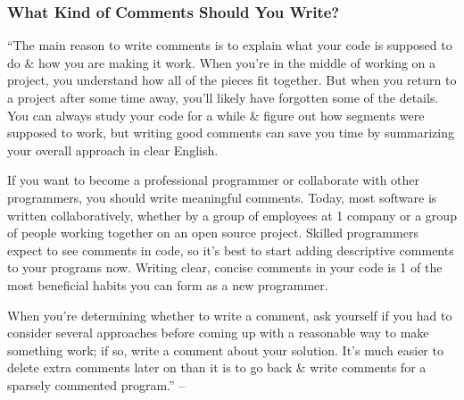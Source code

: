 \documentclass[oneside]{book}
\numberwithin{equation}{section}
\begin{document}
\subsubsection{What Kind of Comments Should You Write?}
``The main reason to write comments is to explain what your code is supposed to do \& how you are making it work. When you're in the middle of working on a project, you understand how all of the pieces fit together. But when you return to a project after some time away, you'll likely have forgotten some of the details. You can always study your code for a while \& figure out how segments were supposed to work, but writing good comments can save you time by summarizing your overall approach in clear English.

If you want to become a professional programmer or collaborate with other programmers, you should write meaningful comments. Today, most software is written collaboratively, whether by a group of employees at 1 company or a group of people working together on an open source project. Skilled programmers expect to see comments in code, so it's best to start adding descriptive comments to your programs now. Writing clear, concise comments in your code is 1 of the most beneficial habits you can form as a new programmer.

When you're determining whether to write a comment, ask yourself if you had to consider several approaches before coming up with a reasonable way to make something work; if so, write a comment about your solution. It's much easier to delete extra comments later on than it is to go back \& write comments for a sparsely commented program.'' -- \cite[pp. 29--30]{Matthes2019}
\end{document}
